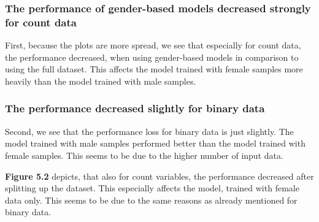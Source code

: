 \documentclass[11pt, a4paper]{book}
\begin{document}
\subsubsection{The performance of gender-based models decreased strongly for count data}
First, because the plots are more spread, we see that especially for count data, the performance decreased, when using gender-based models in comparison to using the full dataset. This affects the model trained with female samples more heavily than the model trained with male samples.

\subsubsection{The performance decreased slightly for binary data}
Second, we see that the performance loss for binary data is just slightly. The model trained with male samples performed better than the model trained with female samples. This seems to be due to the higher number of input data.


\textbf{Figure 5.2} depicts, that also for count variables, the performance decreased after splitting up the dataset. This especially affects the model, trained with female data only. This seems to be due to the same reasons as already mentioned for binary data.
\end{document}
